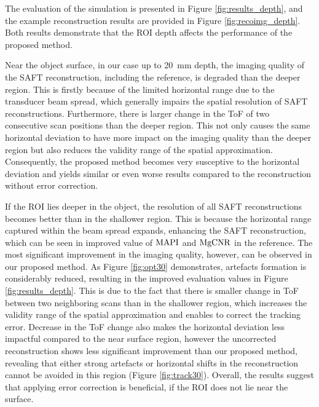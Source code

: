 The evaluation of the simulation  is presented in Figure \ref{fig:results_depth}, and the example reconstruction results are provided in Figure \ref{fig:recoimg_depth}.  Both results demonstrate that the ROI depth affects the performance of the proposed method. \par

Near the object surface, in our case up to \SI{20}{\milli \metre} depth, the imaging quality of the SAFT reconstruction, including the reference, is degraded than the deeper region. This is firstly because of the limited horizontal range due to the transducer beam spread, which generally impairs the spatial resolution of SAFT reconstructions. Furthermore, there is larger change in the ToF of two consecutive scan positions than the deeper region. This not only causes the same horizontal deviation to have more impact on the imaging quality than the deeper region but also reduces the validity range of the spatial approximation. Consequently, the proposed method becomes very susceptive to the horizontal deviation and yields similar or even worse results compared to the reconstruction without error correction. \par

If the ROI lies deeper in the object, the resolution of all SAFT reconstructions becomes better than in the shallower region. This is because the horizontal range captured within the beam spread expands, enhancing the SAFT reconstruction, which can be seen in improved value of $\operatorname{MAPI}$ and $\operatorname{MgCNR}$ in the reference. The most significant improvement in the imaging quality, however, can be observed in our proposed method. As Figure \ref{fig:opt30} demonstrates, artefacts formation is considerably reduced, resulting in the improved evaluation values in Figure \ref{fig:results_depth}. This is due to the fact that there is smaller change in ToF between two neighboring scans than in the shallower region, which increases the validity range of the spatial approximation and enables to correct the tracking error. Decrease in the ToF change also makes the horizontal deviation less impactful compared to the near surface region, however the uncorrected reconstruction shows less significant improvement than our proposed method, revealing that either strong artefacts or horizontal shifts in the reconstruction cannot be avoided in this region (Figure \ref{fig:track30}). Overall, the results suggest that applying error correction is beneficial, if the ROI does not lie near the surface. \par

